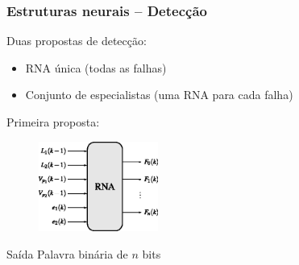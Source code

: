 \documentclass{beamer}
\begin{document}
\begin{frame}
    \frametitle{Estruturas neurais -- Detecção}

    Duas propostas de detecção:

\begin{itemize}
    \item RNA única (todas as falhas)
    \item Conjunto de especialistas (uma RNA para cada falha)
\end{itemize}

    Primeira proposta:

\begin{figure}[htb]
\centering
    \includegraphics[width=0.35\textwidth]{imgs/sistema/eps/detec_prop_1}
\end{figure}

    Saída \implica Palavra binária de $n$ bits
    
\end{frame}
\end{document}
